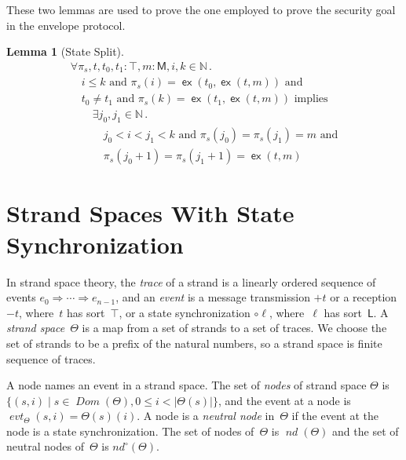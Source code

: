 \documentclass[12pt]{article}
\newtheorem{lem}[thm]{Lemma}
\newcommand{\cn}[1]{\ensuremath{\operatorname{\mathsf{#1}}}}
\newcommand{\fn}[1]{\ensuremath{\operatorname{\mathit{#1}}}}
\newcommand{\srt}[1]{\ensuremath{\mathsf{#1}}}
\newcommand{\typ}{\mathbin:}
\newcommand{\inbnd}{\mathord -}
\newcommand{\outbnd}{\mathord +}
\newcommand{\neutral}{\mathord\circ}
\newcommand{\nat}{\ensuremath{\mathbb{N}}}
\newcommand{\all}[1]{\forall#1\mathpunct.}
\newcommand{\some}[1]{\exists#1\mathpunct.}
\newcommand{\nodes}{\fn{nd}}
\newcommand{\nnodes}{\operatorname{\mathit{nd}^{\neutral}}}
\newcommand{\extend}{\cn{ex}}
\newcommand{\pth}{\ensuremath{\pi}}
\newcommand{\evt}{\fn{evt}}
\newcommand{\sdom}{\fn{Dom}}
\begin{document}
These two lemmas are used to prove the one employed to prove the
security goal in the envelope protocol.


\begin{lem}[State Split]\label{lem:state split}
\begingroup\rm
$$\begin{array}{l}
\all{\pth_s,t,t_0,t_1\typ\top,m\typ\srt{M},i,k\in\nat}\\
\quad\mbox{$i\leq k$ and $\pth_s(i)=\extend(t_0,\extend(t,m))$ and}\\
\quad\mbox{$t_0\neq t_1$ and $\pth_s(k)=\extend(t_1,\extend(t,m))$ implies}\\
\qquad\some{j_0,j_1\in\nat}\\
\qquad\quad\mbox{$j_0<i<j_1<k$ and $\pth_s(j_0)=\pth_s(j_1)=m$ and}\\
\qquad\quad\mbox{$\pth_s(j_0+1)=\pth_s(j_1+1)=\extend(t,m)$}
\end{array}$$
\endgroup
\end{lem}

\section{Strand Spaces With State Synchronization}\label{sec:strand spaces}

In strand space theory, the \emph{trace} of a strand is a linearly
ordered sequence of events $e_0\Rightarrow\cdots\Rightarrow e_{n-1}$,
and an \emph{event} is a message transmission $\outbnd t$ or a
reception $\inbnd t$, where~$t$ has sort~$\top$, or a state
synchronization $\neutral\ell$, where~$\ell$ has sort~$\srt{L}$.  A
\emph{strand space}~$\Theta$ is a map from a set of strands to a set
of traces.  We choose the set of strands to be a prefix of the natural
numbers, so a strand space is finite sequence of traces.

A node names an event in a strand space.  The set of \emph{nodes} of
strand space $\Theta$ is $\{(s,i)\mid s\in\sdom(\Theta), 0\leq i <
|\Theta(s)|\}$, and the event at a node is
$\evt_\Theta(s,i)=\Theta(s)(i)$.  A node is a \emph{neutral node}
in~$\Theta$ if the event at the node is a state synchronization.  The set
of nodes of~$\Theta$ is $\nodes(\Theta)$ and the set of neutral nodes
of~$\Theta$ is $\nnodes(\Theta)$.
\end{document}
